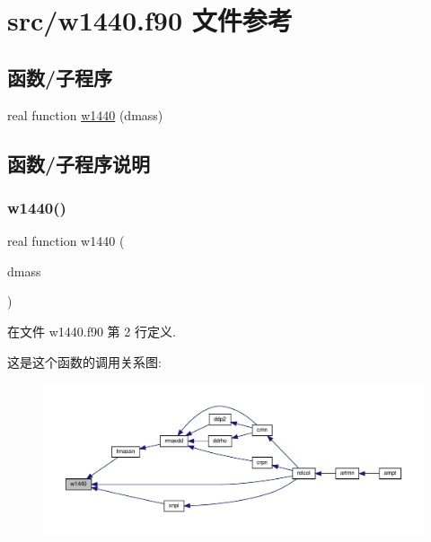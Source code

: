 \hypertarget{w1440_8f90}{}\section{src/w1440.f90 文件参考}
\label{w1440_8f90}
\subsection*{函数/子程序}
\begin{DoxyCompactItemize}
\item 
real function \mbox{\hyperlink{w1440_8f90_a6c8e84f405d824612011457645acecac}{w1440}} (dmass)
\end{DoxyCompactItemize}


\subsection{函数/子程序说明}
\mbox{\label{w1440_8f90_a6c8e84f405d824612011457645acecac}} 
\subsubsection{\texorpdfstring{w1440()}{w1440()}}
{\footnotesize\ttfamily real function w1440 (\begin{DoxyParamCaption}\item[{}]{dmass }\end{DoxyParamCaption})}



在文件 w1440.\+f90 第 2 行定义.

这是这个函数的调用关系图\+:
\nopagebreak
\begin{figure}[H]
\begin{center}
\leavevmode
\includegraphics[width=350pt]{w1440_8f90_a6c8e84f405d824612011457645acecac_icgraph}
\end{center}
\end{figure}
